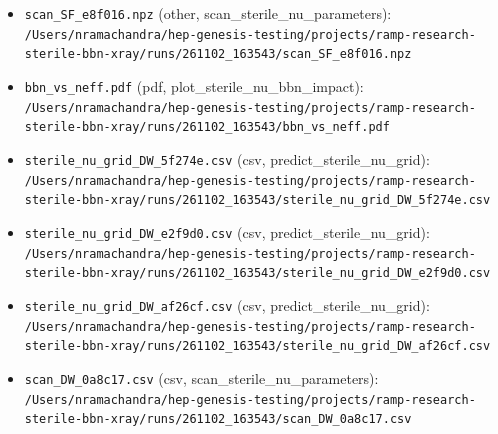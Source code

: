 \documentclass[11pt,a4paper]{article}
\begin{document}
\begin{itemize}
  \item \texttt{scan\_\allowbreak{}SF\_\allowbreak{}e8f016.npz} (other, scan\_sterile\_nu\_parameters): \texttt{/\allowbreak{}Users/\allowbreak{}nramachandra/\allowbreak{}hep-genesis-testing/\allowbreak{}projects/\allowbreak{}ramp-research-sterile-bbn-xray/\allowbreak{}runs/\allowbreak{}261102\_\allowbreak{}163543/\allowbreak{}scan\_\allowbreak{}SF\_\allowbreak{}e8f016.npz}
  \item \texttt{bbn\_\allowbreak{}vs\_\allowbreak{}neff.pdf} (pdf, plot\_sterile\_nu\_bbn\_impact): \texttt{/\allowbreak{}Users/\allowbreak{}nramachandra/\allowbreak{}hep-genesis-testing/\allowbreak{}projects/\allowbreak{}ramp-research-sterile-bbn-xray/\allowbreak{}runs/\allowbreak{}261102\_\allowbreak{}163543/\allowbreak{}bbn\_\allowbreak{}vs\_\allowbreak{}neff.pdf}
  \item \texttt{sterile\_\allowbreak{}nu\_\allowbreak{}grid\_\allowbreak{}DW\_\allowbreak{}5f274e.csv} (csv, predict\_sterile\_nu\_grid): \texttt{/\allowbreak{}Users/\allowbreak{}nramachandra/\allowbreak{}hep-genesis-testing/\allowbreak{}projects/\allowbreak{}ramp-research-sterile-bbn-xray/\allowbreak{}runs/\allowbreak{}261102\_\allowbreak{}163543/\allowbreak{}sterile\_\allowbreak{}nu\_\allowbreak{}grid\_\allowbreak{}DW\_\allowbreak{}5f274e.csv}
  \item \texttt{sterile\_\allowbreak{}nu\_\allowbreak{}grid\_\allowbreak{}DW\_\allowbreak{}e2f9d0.csv} (csv, predict\_sterile\_nu\_grid): \texttt{/\allowbreak{}Users/\allowbreak{}nramachandra/\allowbreak{}hep-genesis-testing/\allowbreak{}projects/\allowbreak{}ramp-research-sterile-bbn-xray/\allowbreak{}runs/\allowbreak{}261102\_\allowbreak{}163543/\allowbreak{}sterile\_\allowbreak{}nu\_\allowbreak{}grid\_\allowbreak{}DW\_\allowbreak{}e2f9d0.csv}
  \item \texttt{sterile\_\allowbreak{}nu\_\allowbreak{}grid\_\allowbreak{}DW\_\allowbreak{}af26cf.csv} (csv, predict\_sterile\_nu\_grid): \texttt{/\allowbreak{}Users/\allowbreak{}nramachandra/\allowbreak{}hep-genesis-testing/\allowbreak{}projects/\allowbreak{}ramp-research-sterile-bbn-xray/\allowbreak{}runs/\allowbreak{}261102\_\allowbreak{}163543/\allowbreak{}sterile\_\allowbreak{}nu\_\allowbreak{}grid\_\allowbreak{}DW\_\allowbreak{}af26cf.csv}
  \item \texttt{scan\_\allowbreak{}DW\_\allowbreak{}0a8c17.csv} (csv, scan\_sterile\_nu\_parameters): \texttt{/\allowbreak{}Users/\allowbreak{}nramachandra/\allowbreak{}hep-genesis-testing/\allowbreak{}projects/\allowbreak{}ramp-research-sterile-bbn-xray/\allowbreak{}runs/\allowbreak{}261102\_\allowbreak{}163543/\allowbreak{}scan\_\allowbreak{}DW\_\allowbreak{}0a8c17.csv}

\end{itemize}
\end{document}
